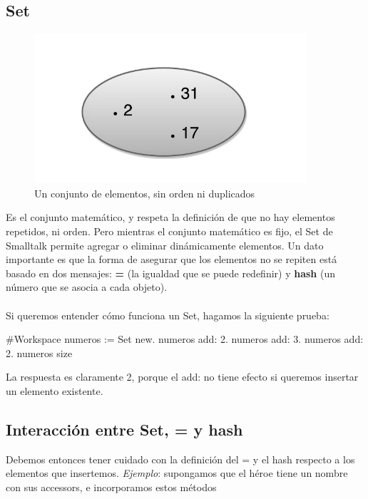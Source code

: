 \documentclass[a4paper,12pt]{book}
\begin{document}
\subsection{Set}

\begin{figure}[h!]
    \centering
    \includegraphics[width=0.9\textwidth]{images/40_Set.pdf}
    \caption{Un conjunto de elementos, sin orden ni duplicados}
\end{figure}
\FloatBarrier

Es el conjunto matemático, y respeta la definición de que no hay elementos repetidos, ni orden. Pero mientras
el conjunto matemático es fijo, el Set de Smalltalk permite agregar o eliminar dinámicamente elementos. 
Un dato importante es que la forma de asegurar que los elementos no se repiten está basado en dos mensajes:
\textbf{=} (la igualdad que se puede redefinir) y \textbf{hash} (un número que se asocia a cada objeto).
\\
\\
Si queremos entender cómo funciona un Set, hagamos la siguiente prueba:

\begin{code}
#Workspace
numeros := Set new.
numeros add: 2.
numeros add: 3.
numeros add: 2.
numeros size
\end{code}

La respuesta es claramente 2, porque el add: no tiene efecto si queremos insertar un elemento existente.

\subsection{Interacción entre Set, = y hash}
Debemos entonces tener cuidado con la definición del = y el hash respecto a los elementos que insertemos.
\textit{Ejemplo}: supongamos que el héroe tiene un nombre con sus accessors, e incorporamos estos métodos
\end{document}
